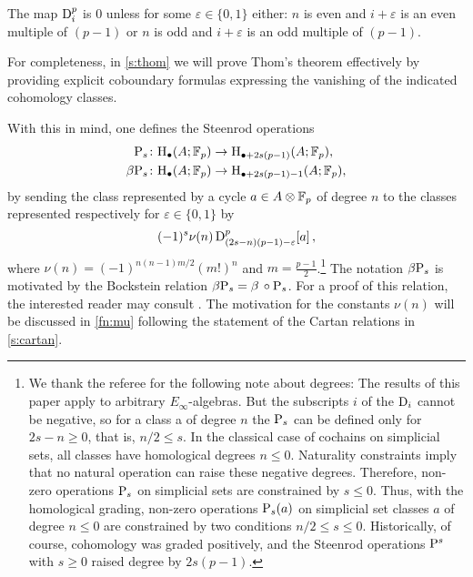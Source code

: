 \begin{theorem}[Thom]\label{t:thom}
	The map $\mathrm{D}_i^p$ is $0$ unless for some $\varepsilon \in \{0,1\}$ either: $n$ is even and $i+\varepsilon$ is an even multiple of $(p-1)$ or $n$ is odd and $i+\varepsilon$ is an odd multiple of $(p-1)$.
\end{theorem}

For completeness, in \cref{s:thom} we will prove Thom's theorem effectively by providing explicit coboundary formulas expressing the vanishing of the indicated cohomology classes.

With this in mind, one defines the Steenrod operations
\begin{align*}
	\mathrm{P}_s \colon& \mathrm{H}_\bullet(A; {\mathbb{F}_p}) \to \mathrm{H}_{\bullet + 2s(p-1)}(A; {\mathbb{F}_p}), \\
	\beta \mathrm{P}_s \colon& \mathrm{H}_\bullet(A; {\mathbb{F}_p}) \to \mathrm{H}_{\bullet + 2s(p-1) - 1}(A; {\mathbb{F}_p}),
\end{align*}
by sending the class represented by a cycle $a \in A \otimes {\mathbb{F}_p}$ of degree $n$ to the classes represented respectively for $\varepsilon \in \{0,1\}$ by
\[
(-1)^s \nu(n) \, \mathrm{D}^p_{(2s-n)(p-1)-\varepsilon}[a] \,,
\]
where $\nu(n) = (-1)^{n(n-1)m/2}(m!)^n$ and $m = \frac{p-1}{2}$.\footnote{
	We thank the referee for the following note about degrees:
	The results of this paper apply to arbitrary $E_\infty$-algebras.
	But the subscripts $i$ of the $\mathrm{D}_i$ cannot be negative, so for a class a of degree $n$ the $\mathrm{P}_s$ can be defined only for $2s-n \geq 0$, that is, $n/2 \leq s$.
	In the classical case of cochains on simplicial sets, all classes have homological degrees $n \leq 0$.
	Naturality constraints imply that no natural operation can raise these negative degrees.
	Therefore, non-zero operations $\mathrm{P}_s$ on simplicial sets are constrained by $s \leq 0$.
	Thus, with the homological grading, non-zero operations $\mathrm{P}_s(a)$ on simplicial set classes $a$ of degree $n \leq 0$ are constrained by two conditions $n/2 \leq s \leq 0$.
	Historically, of course, cohomology was graded positively, and the Steenrod operations $\mathrm{P}^s$ with $s \geq 0$ raised degree by $2s(p-1)$.
}
The notation $\beta \mathrm{P}_s$ is motivated by the Bockstein relation $\beta \mathrm{P}_s = \beta\, \mathbin{\circ} \mathrm{P}_s$.
For a proof of this relation, the interested reader may consult \cite[Prop.~2.3(v)]{may1970general}.
The motivation for the constants $\nu(n)$ will be discussed in \cref{fn:mu} following the statement of the Cartan relations in \cref{s:cartan}.
